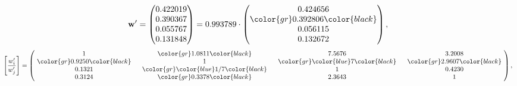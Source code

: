 \begin{example}
\begin{equation*}
\mathbf{w}^{\prime} =
\begin{pmatrix}
0.422019\\
0.390367\\
0.055767\\
0.131848
\end{pmatrix} =
0.993789\cdot
\begin{pmatrix}
0.424656\\
\color{gr} 0.392806\color{black} \\
0.056115\\
0.132672
\end{pmatrix},
\end{equation*}
\begin{equation*}
\left[ \frac{{w}^{\prime}_i}{{w}^{\prime}_j} \right] =
\begin{pmatrix}
$\,\,$ 1 $\,\,$ & $\,\,$\color{gr} 1.0811\color{black} $\,\,$ & $\,\,$7.5676$\,\,$ & $\,\,$3.2008$\,\,$ \\
$\,\,$\color{gr} 0.9250\color{black} $\,\,$ & $\,\,$ 1 $\,\,$ & $\,\,$\color{gr} \color{blue} 7\color{black} $\,\,$ & $\,\,$\color{gr} 2.9607\color{black}   $\,\,$ \\
$\,\,$0.1321$\,\,$ & $\,\,$\color{gr} \color{blue}  1/7\color{black} $\,\,$ & $\,\,$ 1 $\,\,$ & $\,\,$0.4230 $\,\,$ \\
$\,\,$0.3124$\,\,$ & $\,\,$\color{gr} 0.3378\color{black} $\,\,$ & $\,\,$2.3643$\,\,$ & $\,\,$ 1  $\,\,$ \\
\end{pmatrix},
\end{equation*}
\end{example}
\newpage
